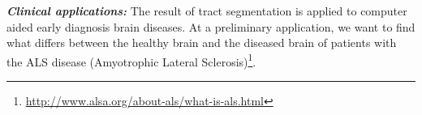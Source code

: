 \textbf{\textit{Clinical applications:}}
The result of tract segmentation is applied to computer aided early diagnosis brain diseases. At a preliminary application, we want to find what differs between the healthy brain and the diseased brain of patients with the ALS disease (Amyotrophic Lateral Sclerosis)\footnote{\url{http://www.alsa.org/about-als/what-is-als.html}}. 
